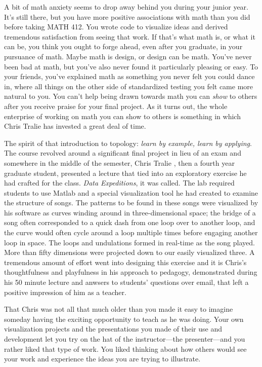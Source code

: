 \documentclass[../main.tex]{subfiles}
\begin{document}
A bit of math anxiety seems to drop away behind you during your junior year. It's still there, but you have more positive associations with math than you did before taking MATH 412. You wrote code to visualize ideas and derived tremendous satisfaction from seeing that work. If that's what math is, or what it can be, you think you ought to forge ahead, even after you graduate, in your pursuance of math. Maybe math is design, or design can be math. You've never been bad at math, but you've also never found it particularly pleasing or easy. To your friends, you've explained math as something you never felt you could dance in, where all things on the other side of standardized testing you felt came more natural to you. You can't help being drawn towards math you can \textit{show} to others after you receive praise for your final project. As it turns out, the whole enterprise of working on math you can show to others is something in which Chris Tralie has invested a great deal of time.

The spirit of that introduction to topology: \textit{learn by example, learn by applying}. The course revolved around a significant final project in lieu of an exam and somewhere in the middle of the semester, Chris Tralie , then a fourth year graduate student, presented a lecture that tied into an exploratory exercise he had crafted for the class. \textit{Data Expeditions}, it was called. The lab required students to use Matlab and a special visualization tool he had created to examine the structure of songs. The patterns to be found in these songs were visualized by his software as curves winding around in three-dimensional space; the bridge of a song often corresponded to a quick dash from one loop over to another loop, and the curve would often cycle around a loop multiple times before engaging another loop in space. The loops and undulations formed in real-time as the song played. More than fifty dimensions were projected down to our easily visualized three. A tremendous amount of effort went into designing this exercise and it is Chris's thoughtfulness and playfulness in his approach to pedagogy, demonstrated during his 50 minute lecture and anwsers to students' questions over email, that left a positive impression of him as a teacher.

That Chris was not all that much older than you made it easy to imagine someday having the exciting opportunity to teach as he was doing. Your own visualization projects and the presentations you made of their use and development let you try on the hat of the instructor---the presenter---and you rather liked that type of work. You liked thinking about how others would see your work and experience the ideas you are trying to illustrate.
\end{document}
